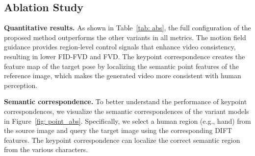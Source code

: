 \subsection{Ablation Study}
\textbf{Quantitative results.}
As shown in Table~\ref{tab: abs}, the full configuration of the proposed method outperforms the other variants in all metrics. The motion field guidance provides region-level control signals that enhance video consistency, resulting in lower FID-FVD and FVD.
The keypoint correspondence creates the feature map of the target pose by localizing the semantic point features of the reference image, which makes the generated video more consistent with human perception.

\textbf{Semantic correspondence.} To better understand the performance of keypoint correspondences, we visualize the semantic correspondences of the variant models in Figure~\ref{fig: point_abs}. Specifically, we select a human region (e.g., hand) from the source image and query the target image using the corresponding DIFT features. The keypoint correspondence can localize the correct semantic region from the various characters.